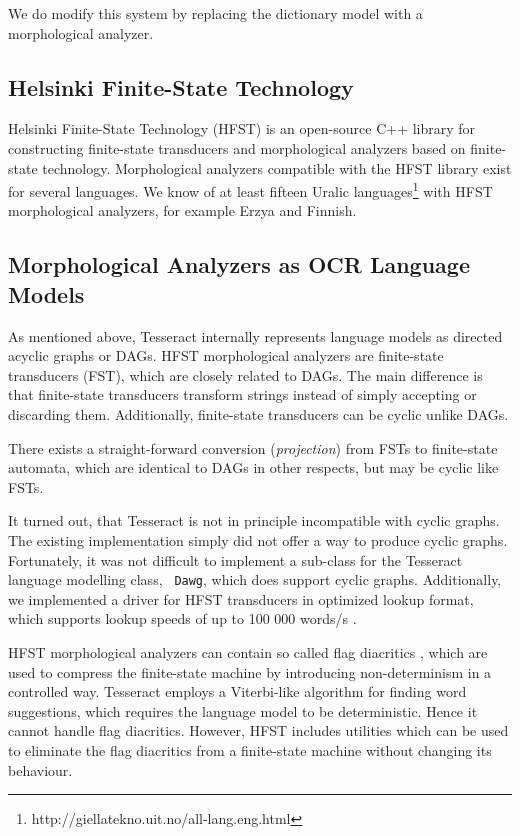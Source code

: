 \documentclass[b5paper]{article}
\begin{document}
We do modify this system by replacing the dictionary model with a
morphological analyzer.

\subsection{Helsinki Finite-State Technology}
Helsinki Finite-State Technology (HFST) \cite{linden13} is an
open-source C++ library for constructing finite-state transducers and
morphological analyzers based on finite-state
technology. Morphological analyzers compatible with the HFST library
exist for several languages. We know of at least fifteen Uralic
languages\footnote{http://giellatekno.uit.no/all-lang.eng.html} with
HFST morphological analyzers, for example Erzya and Finnish.

\subsection{Morphological Analyzers as OCR Language Models}
As mentioned above, Tesseract internally represents language models as
directed acyclic graphs or DAGs. HFST morphological analyzers are
finite-state transducers (FST), which are closely related to DAGs. The
main difference is that finite-state transducers transform strings
instead of simply accepting or discarding them. Additionally,
finite-state transducers can be cyclic unlike DAGs.

There exists a straight-forward conversion ({\it projection})
from FSTs to finite-state automata, which are identical to DAGs in
other respects, but may be cyclic like FSTs. 

It turned out, that Tesseract is not in principle incompatible with
cyclic graphs. The existing implementation simply did not offer a way
to produce cyclic graphs. Fortunately, it was not difficult to
implement a sub-class for the Tesseract language modelling class, {\tt
  Dawg}, which does support cyclic graphs. Additionally, we
implemented a driver for HFST transducers in optimized lookup format,
which supports lookup speeds of up to 100 000 words/s
\cite{silfverberg09}.

HFST morphological analyzers can contain so called flag diacritics
\cite{beesley03}, which are used to compress the finite-state machine
by introducing non-determinism in a controlled way. Tesseract employs
a Viterbi-like algorithm for finding word suggestions, which requires
the language model to be deterministic. Hence it cannot handle flag
diacritics. However, HFST includes utilities which can be used to
eliminate the flag diacritics from a finite-state machine without
changing its behaviour.
\end{document}
